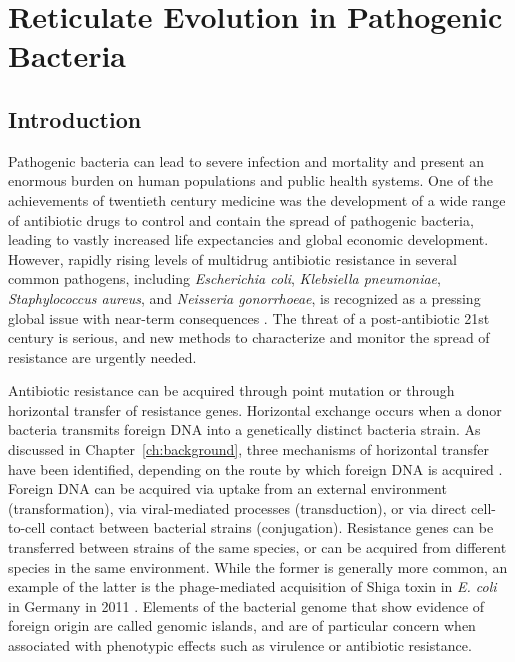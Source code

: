 \chapter{Reticulate Evolution in Pathogenic Bacteria}
\label{ch:pathogens}

\section{Introduction}
\label{pathogens:introduction}

Pathogenic bacteria can lead to severe infection and mortality and present an enormous burden on human populations and public health systems.
One of the achievements of twentieth century medicine was the development of a wide range of antibiotic drugs to control and contain the spread of pathogenic bacteria, leading to vastly increased life expectancies and global economic development.
However, rapidly rising levels of multidrug antibiotic resistance in several common pathogens, including \emph{Escherichia coli}, \emph{Klebsiella pneumoniae}, \emph{Staphylococcus aureus}, and \emph{Neisseria gonorrhoeae}, is recognized as a pressing global issue with near-term consequences \cite{Neu:1992gk,Thomas:2005hp,WHO:2014wa}.
The threat of a post-antibiotic 21st century is serious, and new methods to characterize and monitor the spread of resistance are urgently needed.

Antibiotic resistance can be acquired through point mutation or through horizontal transfer of resistance genes.
Horizontal exchange occurs when a donor bacteria transmits foreign DNA into a genetically distinct bacteria strain.
As discussed in Chapter~\ref{ch:background}, three mechanisms of horizontal transfer have been identified, depending on the route by which foreign DNA is acquired \cite{Ochman:2000dr}.
Foreign DNA can be acquired via uptake from an external environment (transformation), via viral-mediated processes (transduction), or via direct cell-to-cell contact between bacterial strains (conjugation).
Resistance genes can be transferred between strains of the same species, or can be acquired from different species in the same environment.
While the former is generally more common, an example of the latter is the phage-mediated acquisition of Shiga toxin in \emph{E. coli} in Germany in 2011 \cite{Rohde:2011ju}.
Elements of the bacterial genome that show evidence of foreign origin are called genomic islands, and are of particular concern when associated with phenotypic effects such as virulence or antibiotic resistance.


